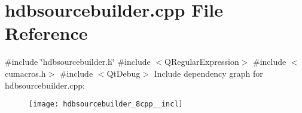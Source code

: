 \section{hdbsourcebuilder.\+cpp File Reference}
\label{hdbsourcebuilder_8cpp}
{\ttfamily \#include \char`\"{}hdbsourcebuilder.\+h\char`\"{}}\newline
{\ttfamily \#include $<$Q\+Regular\+Expression$>$}\newline
{\ttfamily \#include $<$cumacros.\+h$>$}\newline
{\ttfamily \#include $<$Qt\+Debug$>$}\newline
Include dependency graph for hdbsourcebuilder.\+cpp\+:
\nopagebreak
\begin{figure}[H]
\begin{center}
\leavevmode
\texttt{[image: hdbsourcebuilder\_8cpp\_\_incl]}
\end{center}
\end{figure}
